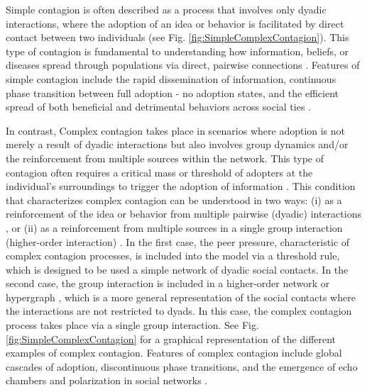 Simple contagion is often described as a process that involves only dyadic interactions, where the adoption of an idea or behavior is facilitated by direct contact between two individuals (see Fig. \ref{fig:SimpleComplexContagion}). This type of contagion is fundamental to understanding how information, beliefs, or diseases spread through populations via direct, pairwise connections \cite{pastor2001epidemic, newman2002spread}. Features of simple contagion include the rapid dissemination of information, continuous phase transition between full adoption - no adoption states, and the efficient spread of both beneficial and detrimental behaviors across social ties \cite{christakis2007spread, fowler2009cooperative}.

In contrast, Complex contagion takes place in scenarios where adoption is not merely a result of dyadic interactions but also involves group dynamics and/or the reinforcement from multiple sources within the network. This type of contagion often requires a critical mass or threshold of adopters at the individual's surroundings to trigger the adoption of information \cite{centola-2007,centola-2010}. This condition that characterizes complex contagion can be understood in two ways: (i) as a reinforcement of the idea or behavior from multiple pairwise (dyadic) interactions \cite{centola-2007,centola-2010}, or (ii) as a reinforcement from multiple sources in a single group interaction (higher-order interaction) \cite{iacopini-2019,de-arruda-2020,battiston-2021}. In the first case, the peer pressure, characteristic of complex contagion processes, is included into the model via a threshold rule, which is designed to be used a simple network of dyadic social contacts. In the second case, the group interaction is included in a higher-order network or hypergraph \cite{berge1984hypergraphs}, which is a more general representation of the social contacts where the interactions are not restricted to dyads. In this case, the complex contagion process takes place via a single group interaction. See Fig. \ref{fig:SimpleComplexContagion} for a graphical representation of the different examples of complex contagion. Features of complex contagion include global cascades of adoption, discontinuous phase transitions, and the emergence of echo chambers and polarization in social networks \cite{centola-2007,diaz-diaz-2022}.


